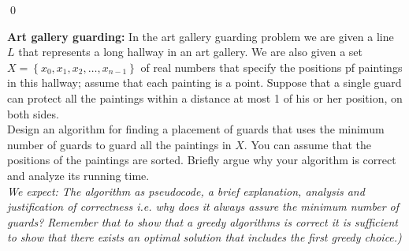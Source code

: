\documentclass{report}
\begin{document}
    \qed

\newpage
    \qs {} {

\textbf{Art gallery guarding:} In the art gallery guarding problem we are given a line $L$ that represents a long hallway in an art gallery. We are also given a set $X=\left\{x_0, x_1, x_2, \ldots, x_{n-1}\right\}$ of real numbers that specify the positions pf paintings in this hallway; assume that each painting is a point. Suppose that a single guard can protect all the paintings within a distance at most 1 of his or her position, on both sides. \\

Design an algorithm for finding a placement of guards that uses the minimum number of guards to guard all the paintings in $X$. You can assume that the positions of the paintings are sorted. Briefly argue why your algorithm is correct and analyze its running time. \\

\textit{We expect: The algorithm as pseudocode, a brief explanation, analysis and justification of correctness i.e. why does it always assure the minimum number of guards? Remember that to show that a greedy algorithms is correct it is sufficient to show that there exists an optimal solution that includes the first greedy choice.)}

    }
\end{document}
